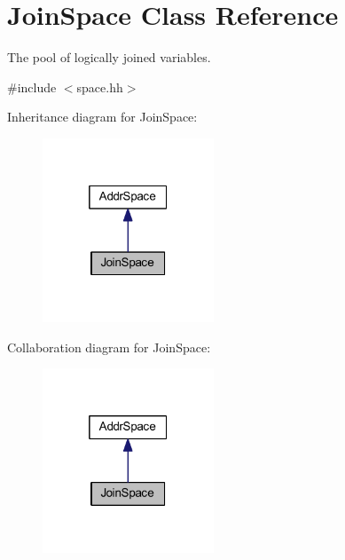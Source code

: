 \hypertarget{class_join_space}{}\section{Join\+Space Class Reference}
\label{class_join_space}


The pool of logically joined variables.  




{\ttfamily \#include $<$space.\+hh$>$}



Inheritance diagram for Join\+Space\+:
\nopagebreak
\begin{figure}[H]
\begin{center}
\leavevmode
\includegraphics[width=145pt]{class_join_space__inherit__graph}
\end{center}
\end{figure}


Collaboration diagram for Join\+Space\+:
\nopagebreak
\begin{figure}[H]
\begin{center}
\leavevmode
\includegraphics[width=145pt]{class_join_space__coll__graph}
\end{center}
\end{figure}
